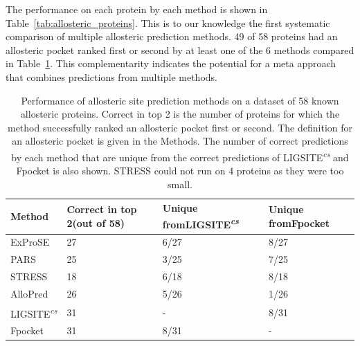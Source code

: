 The performance on each protein by each method is shown in Table~\ref{tab:allosteric_proteins}.
This is to our knowledge the first systematic comparison of multiple allosteric prediction methods.
49 of 58 proteins had an allosteric pocket ranked first or second by at least one of the 6 methods compared in Table~\ref{tab:allosteric_methods}.
This complementarity indicates the potential for a meta approach that combines predictions from multiple methods.


\begin{table}
\centering

\begin{footnotesize}
\begin{tabular}{ p{3cm} p{3cm} p{3cm} p{3cm} }
\hline
\textbf{Method} & \textbf{Correct in top 2\newline (out of 58)} & \textbf{Unique from\newline LIGSITE\textsuperscript{\it cs}} & \textbf{Unique from\newline Fpocket} \\
\hline
ExProSE                         & 27 & 6/27 & 8/27 \\
PARS                            & 25 & 3/25 & 7/25 \\
STRESS                          & 18 & 6/18 & 8/18 \\
AlloPred                        & 26 & 5/26 & 1/26 \\
LIGSITE\textsuperscript{\it cs} & 31 & -    & 8/31 \\
Fpocket                         & 31 & 8/31 & -    \\
\hline
\end{tabular}
\end{footnotesize}

\caption[Performance of allosteric site prediction methods on a dataset of 58 known allosteric proteins - summary]
{Performance of allosteric site prediction methods on a dataset of 58 known allosteric proteins.
Correct in top 2 is the number of proteins for which the method successfully ranked an allosteric pocket first or second.
The definition for an allosteric pocket is given in the Methods.
The number of correct predictions by each method that are unique from the correct predictions of LIGSITE\textsuperscript{\it cs} and Fpocket is also shown.
STRESS could not run on 4 proteins as they were too small.}

\label{tab:allosteric_methods}
\end{table}


